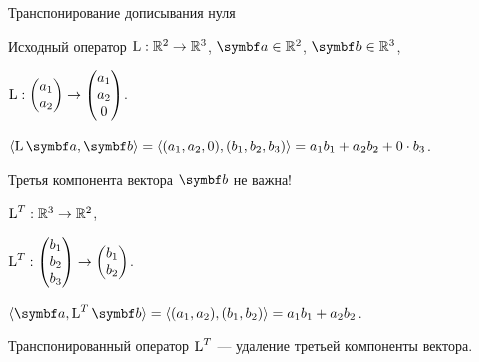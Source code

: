 \begin{frame}{Транспонирование дописывания нуля}


Исходный оператор $\operatorname{L}: \mathbb{R}^2 \to \mathbb{R}^3$, $\ba \in \R^2$, $\bb\in \R^3$,

$\operatorname{L}: \begin{pmatrix}
    a_1 \\
    a_2 \\
\end{pmatrix} \to \begin{pmatrix}
    a_1 \\
    a_2 \\
    0 \\
\end{pmatrix}$.
\pause

$\langle \LL \ba , \bb \rangle = \langle (a_1, a_2, 0) , (b_1, b_2, b_3) \rangle = 
 a_1 b_1 + a_2 b_2 + 0 \cdot b_3$.
\pause


Третья компонента вектора $\bb$ не важна!
\pause

$\operatorname{L}^T  : \mathbb{R}^3 \to \mathbb{R}^2$,

$\operatorname{L}^T: \begin{pmatrix}
    b_1 \\
    b_2 \\
    b_3
\end{pmatrix} \to \begin{pmatrix}
    b_1 \\
    b_2 \\
\end{pmatrix}$.
\pause

$\langle \ba , \LL^T \bb \rangle = \langle (a_1, a_2) , (b_1, b_2) \rangle =  a_1 b_1 + a_2 b_2$.
\pause

Транспонированный оператор $\operatorname{L}^T$ — удаление третьей компоненты вектора.

\end{frame}
    

